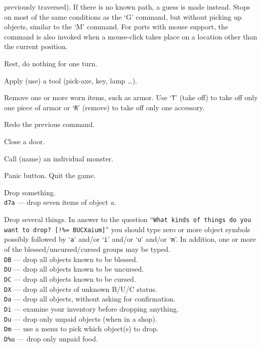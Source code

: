 previously traversed).  If there is no known path, a guess is made instead.
Stops on most of 
the same conditions as the `G' command, but without picking up
objects, similar to the `M' command.  For ports with mouse 
support, the command is also invoked when a mouse-click takes place on a 
location other than the current position.
\item[\tb{.}]
Rest, do nothing for one turn.
\item[\tb{a}]
Apply (use) a tool (pick-axe, key, lamp \ldots).
\item[\tb{A}]
Remove one or more worn items, such as armor.
Use `{\tt T}' (take off) to take off only one piece of armor 
or `{\tt R}' (remove) to take off only one accessory.
\item[\tb{\^{}A}]
Redo the previous command.
\item[\tb{c}]
Close a door.
\item[\tb{C}]
Call (name) an individual monster.
\item[\tb{\^{}C}]
Panic button.  Quit the game.
\item[\tb{d}]
Drop something.\\
{\tt d7a} --- drop seven items of object
{\it a}.
\item[\tb{D}]
Drop several things.  In answer to the question
``{\tt What kinds of things do you want to drop? [!\%= BUCXaium]}''
you should type zero or more object symbols possibly followed by
`{\tt a}' and/or `{\tt i}' and/or `{\tt u}' and/or `{\tt m}'.
In addition, one or more of
the blessed/uncursed/cursed groups may be typed.\\
{\tt DB}  --- drop all objects known to be blessed.\\
{\tt DU}  --- drop all objects known to be uncursed.\\
{\tt DC}  --- drop all objects known to be cursed.\\
{\tt DX}  --- drop all objects of unknown B/U/C status.\\
{\tt Da}  --- drop all objects, without asking for confirmation.\\
{\tt Di}  --- examine your inventory before dropping anything.\\
{\tt Du}  --- drop only unpaid objects (when in a shop).\\
{\tt Dm}  --- use a menu to pick which object(s) to drop.\\
{\tt D\%u} --- drop only unpaid food.
\item[\tb{\^{}D}]
